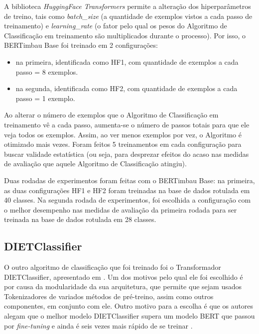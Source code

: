 A biblioteca \textit{HuggingFace Transformers} permite a alteração dos hiperparâmetros de treino, tais como \textit{batch\_size} (a quantidade de exemplos vistos a cada passo de treinamento) e \textit{learning\_rate} (o fator pelo qual os pesos do Algoritmo de Classificação em treinamento são multiplicados durante o processo). Por isso, o BERTimbau Base foi treinado em 2 configurações: 

\begin{itemize}
    \item na primeira, identificada como HF1, com quantidade de exemplos a cada passo = 8 exemplos.
    \item na segunda, identificada como HF2, com quantidade de exemplos a cada passo = 1 exemplo. 
\end{itemize}

Ao alterar o número de exemplos que o Algoritmo de Classificação em treinamento vê a cada passo, aumenta-se o número de passos totais para que ele veja todos os exemplos. Assim, ao ver menos exemplos por vez, o Algoritmo é otimizado mais vezes. Foram feitos 5 treinamentos em cada configuração para buscar validade estatística (ou seja, para desprezar efeitos do acaso nas medidas de avaliação que aquele Algoritmo de Classificação atingiu).

Duas rodadas de experimentos foram feitas com o BERTimbau Base: na primeira, as duas configurações HF1 e HF2 foram treinadas na base de dados rotulada em 40 classes. Na segunda rodada de experimentos, foi escolhida a configuração com o melhor desempenho nas medidas de avaliação da primeira rodada para ser treinada na base de dados rotulada em 28 classes.

\subsection{DIETClassifier}
\label{des_treinamento_rasa}
O outro algoritmo de classificação que foi treinado foi o Transformador DIETClassifier, apresentado em . Um dos motivos pelo qual ele foi escolhido é por causa da modularidade da sua arquitetura, que permite que sejam usados Tokenizadores de variados métodos de pré-treino, assim como outros componentes, em conjunto com ele. Outro motivo para a escolha é que os autores alegam que o melhor modelo DIETClassifier supera um modelo BERT que passou por \textit{fine-tuning} e ainda é seis vezes mais rápido de se treinar \cite{diet_classifier}.

